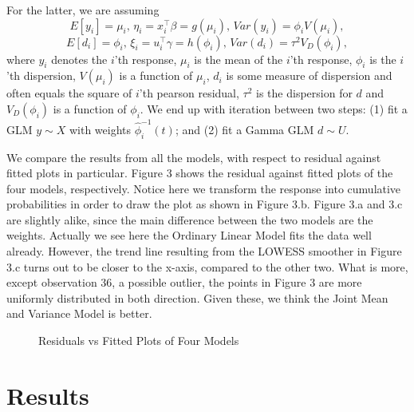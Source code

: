 \documentclass[11pt,letterpaper]{article}
\begin{document}
For the latter, we are assuming $$E[y_i]=\mu_i,\,\eta_i=x_i^\top\beta=g(\mu_i),\,Var(y_i)=\phi_iV(\mu_i),$$
$$E[d_i]=\phi_i,\,\xi_i=u_i^\top\gamma=h(\phi_i),\,Var(d_i)=\tau^2V_D(\phi_i),$$ where $y_i$ denotes the $i$'th response, $\mu_i$ is the mean of the $i$'th response, $\phi_i$ is the $i$'th dispersion, $V(\mu_i)$ is a function of $\mu_i$, $d_i$ is some measure of dispersion and often equals the square of $i$'th pearson residual, $\tau^2$ is the dispersion for $d$ and $V_D(\phi_i)$ is a function of $\phi_i$. We end up with iteration between two steps: (1) fit a GLM $y\sim X$ with weights $\hat{\phi}_i^{-1}(t)$; and (2) fit a Gamma GLM $d\sim U$. \par
We compare the results from all the models, with respect to residual against fitted plots in particular. Figure 3 shows the residual against fitted plots of the four models, respectively. Notice here we transform the response into cumulative probabilities in order to draw the plot as shown in Figure 3.b. Figure 3.a and 3.c are slightly alike, since the main difference between the two models are the weights. Actually we see here the Ordinary Linear Model fits the data well already. However, the trend line resulting from the LOWESS smoother in Figure 3.c turns out to be closer to the x-axis, compared to the other two. What is more, except observation 36, a possible outlier, the points in Figure 3 are more uniformly distributed in both direction. Given these, we think the Joint Mean and Variance Model is better.
\begin{center}
\begin{figure}[htbp]
\caption{Residuals vs Fitted Plots of Four Models}
\end{figure}
\end{center}

\section{Results}
\end{document}

